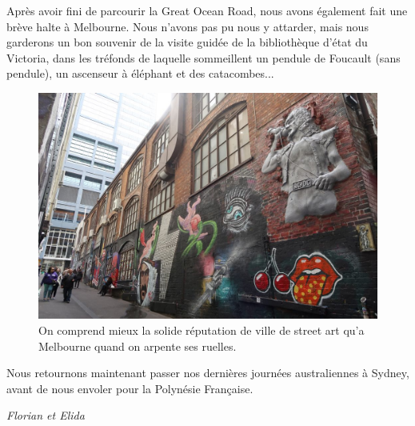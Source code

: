 Après avoir fini de parcourir la Great Ocean Road, nous avons également
fait une brève halte à Melbourne. Nous n'avons pas pu nous y attarder,
mais nous garderons un bon souvenir de la visite guidée de la
bibliothèque d'état du Victoria, dans les tréfonds de laquelle
sommeillent un pendule de Foucault (sans pendule), un ascenseur à
éléphant et des catacombes...

\begin{figure}
\centering
\includegraphics{images/20180731_melbourne.JPG}
\caption{On comprend mieux la solide réputation de ville de street art
qu'a Melbourne quand on arpente ses ruelles.}
\end{figure}

Nous retournons maintenant passer nos dernières journées australiennes à
Sydney, avant de nous envoler pour la Polynésie Française.

\emph{Florian et Elida}



